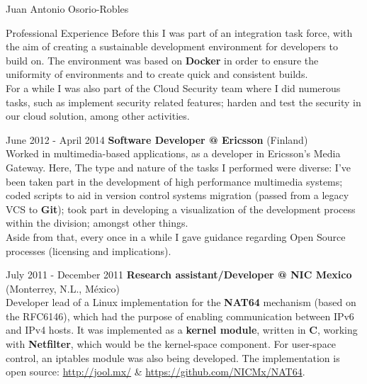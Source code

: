 \documentclass[spanish,10pt,letterpaper]{article}
\begin{document}
\begin{cv}{Juan Antonio Osorio-Robles}
\begin{cvlist}{Professional Experience}
            Before this I was part of an integration task force, with the
            aim of creating a sustainable development environment for
            developers to build on. The environment was based on
            \textbf{Docker} in order to ensure the uniformity of
            environments and to create quick and consistent builds.\\

            For a while I was also part of the Cloud Security team where
            I did numerous tasks, such as implement security related
            features; harden and test the security in our cloud solution,
            among other activities.

		\item [June 2012 - April 2014]
            \textbf{Software Developer @ Ericsson} (Finland)\\
            Worked in multimedia-based applications, as a developer in
            Ericsson's Media Gateway. Here, The type and nature of the
            tasks I performed were diverse: I've been taken part in the
            development of high performance multimedia systems; coded
            scripts to aid in version control systems migration (passed
            from a legacy VCS to \textbf{Git}); took part in developing a
            visualization of the development process within the division;
            amongst other things.\\

            Aside from that, every once in a while I gave guidance
            regarding Open Source processes (licensing and implications).

		\item [July 2011 - December 2011]
            \textbf{Research assistant/Developer @ NIC Mexico} (Monterrey,
            N.L., M\'{e}xico)\\
            Developer lead of a Linux implementation for the \textbf{NAT64}
            mechanism (based on the RFC6146), which had the purpose of
            enabling communication between IPv6 and IPv4 hosts. It was
            implemented as a \textbf{kernel module}, written in \textbf{C},
            working with \textbf{Netfilter}, which would be the kernel-space
            component. For user-space control, an iptables module was also
            being developed. The implementation is open source:
            \href{http://jool.mx/}{http://jool.mx/} \&
            \href{https://github.com/NICMx/NAT64}{https://github.com/NICMx/NAT64}.


\end{cvlist}
\end{cv}
\end{document}
